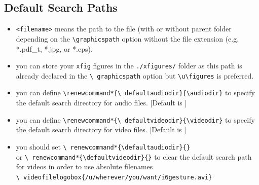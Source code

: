\documentclass[11pt,a4paper,landscape]{article}
\begin{document}
\NewPage\subsection{Default Search Paths}
\vfill
\begin{itemize}
\item \texttt{<filename>} means the path to the file (with or without parent
  folder depending on the \texttt{\textbackslash graphicspath} option
  \alert{without the file extension} (e.g. *.pdf\_t, *.jpg, or *.eps).
\item you can store your \texttt{xfig} figures in the \texttt{./xfigures/}
  folder as this path is already declared in the \texttt{\textbackslash
    graphicspath} option but \texttt{\textbackslash u\textbackslash figures} is
  preferred.
\item you can define \texttt{\textbackslash renewcommand*\{\textbackslash
    defaultaudiodir\}\{\textbackslash audiodir\}} to specify the default search
  directory for audio files. [Default is ]
\item you can define \texttt{\textbackslash renewcommand*\{\textbackslash
    defaultvideodir\}\{\textbackslash videodir\}} to specify the default search
  directory for video files. [Default is ]
\item you \alert{should} set \texttt{\textbackslash
    renewcommand*\{\textbackslash defaultaudiodir\}\{\}} \\ or
  \texttt{\textbackslash
    renewcommand*\{\textbackslash defaultvideodir\}\{\}} to clear the default search path for videos in order to use absolute filenames \eg \\
  \texttt{\textbackslash
    videofilelogobox\{/u/wherever/you/want/i6gesture.avi\}}
\end{itemize}
\vfill
\end{document}
